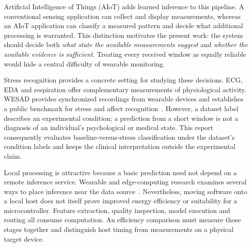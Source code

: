 \documentclass[conference,a4paper]{IEEEtran}
\begin{document}
Artificial Intelligence of Things (AIoT) adds learned inference to this pipeline. A conventional sensing application can collect and display measurements, whereas an AIoT application can classify a measured pattern and decide what additional processing is warranted. This distinction motivates the present work: the system should decide both \emph{what state the available measurements suggest} and \emph{whether the available evidence is sufficient}. Treating every received window as equally reliable would hide a central difficulty of wearable monitoring.

Stress recognition provides a concrete setting for studying these decisions. ECG, EDA and respiration offer complementary measurements of physiological activity. WESAD provides synchronized recordings from wearable devices and establishes a public benchmark for stress and affect recognition~\cite{schmidt2018}. However, a dataset label describes an experimental condition; a prediction from a short window is not a diagnosis of an individual's psychological or medical state. This report consequently evaluates baseline-versus-stress classification under the dataset's condition labels and keeps the clinical interpretation outside the experimental claim.

Local processing is attractive because a basic prediction need not depend on a remote inference service. Wearable and edge-computing research examines several ways to place inference near the data source~\cite{pereira2024,mitro2023}. Nevertheless, moving software onto a local host does not itself prove improved energy efficiency or suitability for a microcontroller. Feature extraction, quality inspection, model execution and routing all consume computation. An efficiency comparison must measure those stages together and distinguish host timing from measurements on a physical target device.
\end{document}
